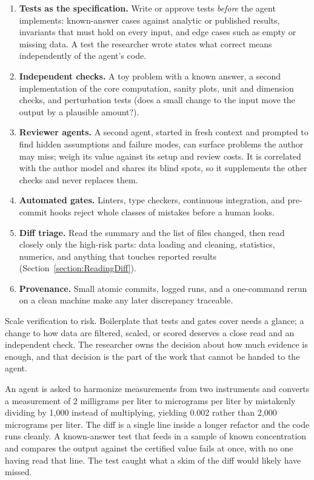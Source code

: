 \begin{enumerate}
\item \textbf{Tests as the specification.} Write or approve tests \emph{before} the agent implements: known-answer cases against analytic or published results, invariants that must hold on every input, and edge cases such as empty or missing data. A test the researcher wrote states what correct means independently of the agent's code.
\item \textbf{Independent checks.} A toy problem with a known answer, a second implementation of the core computation, sanity plots, unit and dimension checks, and perturbation tests (does a small change to the input move the output by a plausible amount?).
\item \textbf{Reviewer agents.} A second agent, started in fresh context and prompted to find hidden assumptions and failure modes, can surface problems the author may miss; weigh its value against its setup and review costs. It is correlated with the author model and shares its blind spots, so it supplements the other checks and never replaces them.
\item \textbf{Automated gates.} Linters, type checkers, continuous integration, and pre-commit hooks reject whole classes of mistakes before a human looks.
\item \textbf{Diff triage.} Read the summary and the list of files changed, then read closely only the high-risk parts: data loading and cleaning, statistics, numerics, and anything that touches reported results (Section~\ref{section:ReadingDiff}).
\item \textbf{Provenance.} Small atomic commits, logged runs, and a one-command rerun on a clean machine make any later discrepancy traceable.
\end{enumerate}

\begin{principle}
\label{principle:ScaleVerification}
Scale verification to risk.
Boilerplate that tests and gates cover needs a glance; a change to how data are filtered, scaled, or scored deserves a close read and an independent check.
The researcher owns the decision about how much evidence is enough, and that decision is the part of the work that cannot be handed to the agent.
\end{principle}

\begin{example}
An agent is asked to harmonize measurements from two instruments and converts a measurement of 2 milligrams per liter to micrograms per liter by mistakenly dividing by 1,000 instead of multiplying, yielding 0.002 rather than 2,000 micrograms per liter.
The diff is a single line inside a longer refactor and the code runs cleanly.
A known-answer test that feeds in a sample of known concentration and compares the output against the certified value fails at once, with no one having read that line.
The test caught what a skim of the diff would likely have missed.
\end{example}

